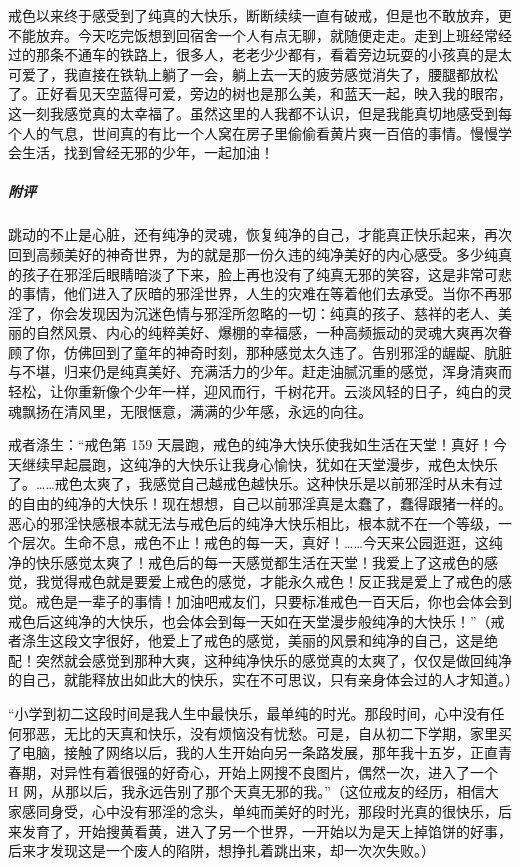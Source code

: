 \begin{case}
    戒色以来终于感受到了纯真的大快乐，断断续续一直有破戒，但是也不敢放弃，更不能放弃。今天吃完饭想到回宿舍一个人有点无聊，就随便走走。走到上班经常经过的那条不通车的铁路上，很多人，老老少少都有，看着旁边玩耍的小孩真的是太可爱了，我直接在铁轨上躺了一会，躺上去一天的疲劳感觉消失了，腰腿都放松了。正好看见天空蓝得可爱，旁边的树也是那么美，和蓝天一起，映入我的眼帘，这一刻我感觉真的太幸福了。虽然这里的人我都不认识，但是我能真切地感受到每个人的气息，世间真的有比一个人窝在房子里偷偷看黄片爽一百倍的事情。慢慢学会生活，找到曾经无邪的少年，一起加油！
    \subparagraph{附评} 跳动的不止是心脏，还有纯净的灵魂，恢复纯净的自己，才能真正快乐起来，再次回到高频美好的神奇世界，为的就是那一份久违的纯净美好的内心感受。多少纯真的孩子在邪淫后眼睛暗淡了下来，脸上再也没有了纯真无邪的笑容，这是非常可悲的事情，他们进入了灰暗的邪淫世界，人生的灾难在等着他们去承受。当你不再邪淫了，你会发现因为沉迷色情与邪淫所忽略的一切：纯真的孩子、慈祥的老人、美丽的自然风景、内心的纯粹美好、爆棚的幸福感，一种高频振动的灵魂大爽再次眷顾了你，仿佛回到了童年的神奇时刻，那种感觉太久违了。告别邪淫的龌龊、肮脏与不堪，归来仍是纯真美好、充满活力的少年。赶走油腻沉重的感觉，浑身清爽而轻松，让你重新像个少年一样，迎风而行，千树花开。云淡风轻的日子，纯白的灵魂飘扬在清风里，无限惬意，满满的少年感，永远的向往。

    戒者涤生：“戒色第 159 天晨跑，戒色的纯净大快乐使我如生活在天堂！真好！今天继续早起晨跑，这纯净的大快乐让我身心愉快，犹如在天堂漫步，戒色太快乐了。……戒色太爽了，我感觉自己越戒色越快乐。这种快乐是以前邪淫时从未有过的自由的纯净的大快乐！现在想想，自己以前邪淫真是太蠢了，蠢得跟猪一样的。恶心的邪淫快感根本就无法与戒色后的纯净大快乐相比，根本就不在一个等级，一个层次。生命不息，戒色不止！戒色的每一天，真好！……今天来公园逛逛，这纯净的快乐感觉太爽了！戒色后的每一天感觉都生活在天堂！我爱上了这戒色的感觉，我觉得戒色就是要爱上戒色的感觉，才能永久戒色！反正我是爱上了戒色的感觉。戒色是一辈子的事情！加油吧戒友们，只要标准戒色一百天后，你也会体会到戒色后这纯净的大快乐，也会体会到每一天如在天堂漫步般纯净的大快乐！”（戒者涤生这段文字很好，他爱上了戒色的感觉，美丽的风景和纯净的自己，这是绝配！突然就会感觉到那种大爽，这种纯净快乐的感觉真的太爽了，仅仅是做回纯净的自己，就能释放出如此大的快乐，实在不可思议，只有亲身体会过的人才知道。）

    “小学到初二这段时间是我人生中最快乐，最单纯的时光。那段时间，心中没有任何邪恶，无比的天真和快乐，没有烦恼没有忧愁。可是，自从初二下学期，家里买了电脑，接触了网络以后，我的人生开始向另一条路发展，那年我十五岁，正直青春期，对异性有着很强的好奇心，开始上网搜不良图片，偶然一次，进入了一个 H 网，从那以后，我永远告别了那个天真无邪的我。”（这位戒友的经历，相信大家感同身受，心中没有邪淫的念头，单纯而美好的时光，那段时光真的很快乐，后来发育了，开始搜黄看黄，进入了另一个世界，一开始以为是天上掉馅饼的好事，后来才发现这是一个废人的陷阱，想挣扎着跳出来，却一次次失败。）


\end{case}
